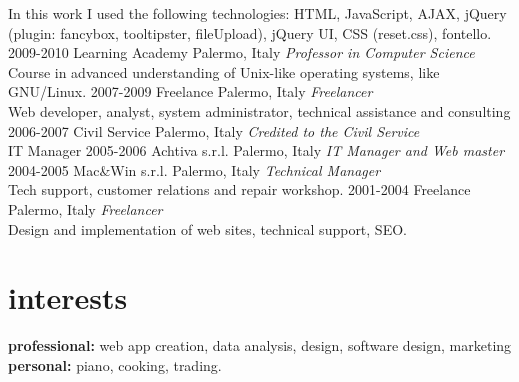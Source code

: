 \documentclass[]{friggeri-cv} %
\begin{document}
\begin{entrylist}
{In this work I used the following technologies: HTML,
JavaScript, AJAX, jQuery (plugin: fancybox, tooltipster, fileUpload),
jQuery UI, CSS (reset.css), fontello.
}
\entry
{2009-2010}
{Learning Academy}
{Palermo, Italy}
{\emph{Professor in Computer Science} \\
Course in advanced understanding of Unix-like operating systems, like GNU/Linux.
}
\entry
{2007-2009}
{Freelance}
{Palermo, Italy}
{\emph{Freelancer} \\
Web developer, analyst, system administrator, technical assistance and consulting
}
\entry
{2006-2007}
{Civil Service}
{Palermo, Italy}
{\emph{Credited to the Civil Service} \\
IT Manager
}
\entry
{2005-2006}
{Achtiva s.r.l.}
{Palermo, Italy}
{\emph{IT Manager and Web master}
}
\entry
{2004-2005}
{Mac\&Win s.r.l.}
{Palermo, Italy}
{\emph{Technical Manager} \\
Tech support, customer relations and repair workshop.
}
\entry
{2001-2004}
{Freelance}
{Palermo, Italy}
{\emph{Freelancer} \\
Design and implementation of web sites, technical support, SEO.
}
\end{entrylist}

\section{interests}
\textbf{professional:} web app creation, data analysis, design, software design, marketing
\textbf{personal:} piano, cooking, trading.
\end{document}
